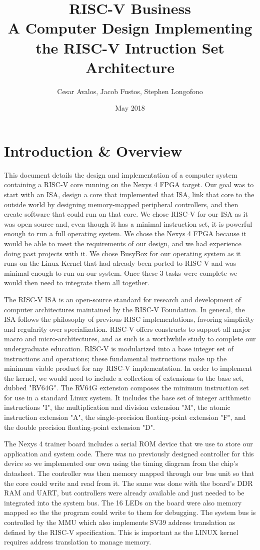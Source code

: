 \documentclass{article}
\title{RISC-V Business\\ \large A Computer Design Implementing the RISC-V Intruction Set Architecture}
\author{Cesar Avalos, Jacob Fustos, Stephen Longofono}
\date{May 2018}
\begin{document}
\maketitle

\tableofcontents
\listoffigures

\section{Introduction \& Overview}
This document details the design and implementation of a computer system containing a RISC-V core running on the Nexys 4 FPGA target. Our goal was to start with an ISA, design a core that implemented that ISA, link that core to the outside world by designing memory-mapped peripheral controllers, and then create software that could run on that core.  We chose RISC-V for our ISA as it was open source and, even though it has a minimal instruction set, it is powerful enough to run a full operating system.  We chose the Nexys 4 FPGA because it would be able to meet the requirements of our design, and we had experience doing past projects with it. We chose BusyBox for our operating system as it runs on the Linux Kernel that had already been ported to RISC-V and was minimal enough to run on our system. Once these 3 tasks were complete we would then need to integrate them all together.

The RISC-V ISA is an open-source standard for research and development of computer architectures maintained by the RISC-V Foundation.   In general, the ISA follows the philosophy of previous RISC implementations, favoring simplicity and regularity over specialization.  RISC-V offers constructs to support all major macro and micro-architectures, and as such is a worthwhile study to complete our undergraduate education.  RISC-V is modularized into a base integer set of instructions and operations; these fundamental instructions make up the minimum viable product for any RISC-V implementation\cite{RISCV_RDR}.  In order to implement the kernel, we would need to include a collection of extensions to the base set, dubbed "RV64G".  The RV64G extension composes the minimum instruction set for use in a standard Linux system.  It includes the base set of integer arithmetic instructions "I", the multiplication and division extension "M", the atomic instruction extension "A", the single-precision floating-point extension "F", and the double precision floating-point extension "D".

The Nexys 4 trainer board includes a serial ROM device that we use to store our application and system code. There was no previously designed controller for this device so we implemented our own using the timing diagram from the chip's datasheet. The controller was then memory mapped through our bus unit so that the core could write and read from it. The same was done with the board's DDR RAM and UART, but controllers were already available and just needed to be integrated into the system bus. The 16 LEDs on the board were also memory mapped so the the program could write to them for debugging. The system bus is controlled by the MMU which also implements SV39 address translation as defined by the RISC-V specification. This is important as the LINUX kernel requires address translation to manage memory.
\end{document}
